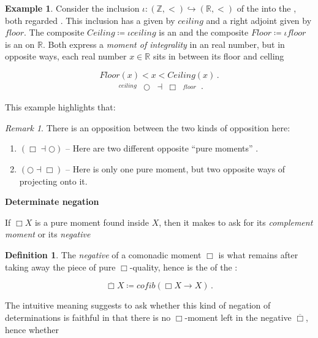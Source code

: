 \documentclass[12pt,titlepage]{article}
\newcommand{\itexarray}[1]{\begin{matrix}#1\end{matrix}}
\newcommand{\lt}{<}
\theoremstyle{plain}
\theoremstyle{definition}
\newtheorem{defn}{Definition}
\newtheorem{example}{Example}
\theoremstyle{remark}
\newtheorem{remark}{Remark}
\begin{document}
\begin{example}
\label{}\hypertarget{}{}
Consider the inclusion $\iota \colon (\mathbb{Z}, \lt) \hookrightarrow (\mathbb{R}, \lt)$ of the  into the , both regarded . This inclusion has a  given by $ceiling$ and a right adjoint given by $floor$. The composite $Ceiling \coloneqq \iota ceiling$ is an  and the composite $Floor \coloneqq \iota floor$ is an  on $\mathbb{R}$. Both express a \emph{moment of integrality} in an real number, but in opposite ways, each real number $x\in \mathbb{R}$ sits in between its floor and celling

\begin{displaymath}
Floor(x) \lt x \lt Ceiling(x)
  \,.
\end{displaymath}
\begin{displaymath}
\itexarray{
     \stackrel{ceiling}{} &\bigcirc &\dashv& \Box & \stackrel{floor}{}
  }
  \,.
\end{displaymath}
\end{example}
This example highlights that:

\begin{remark}
\label{TheTwoKindsOfOpposites}\hypertarget{TheTwoKindsOfOpposites}{}
There is an opposition between the two kinds of opposition here:

\begin{enumerate}%
\item $(\Box \dashv \bigcirc)$ -- Here are two different opposite ``pure moments'' .


\item $(\bigcirc \dashv \Box)$ -- Here is only one pure moment, but two opposite ways of projecting onto it.



\end{enumerate}
\end{remark}
\textbf{Determinate negation}

If $\Box X$ is a pure moment found inside $X$, then it makes to ask for its \emph{complement moment} or its \emph{negative}

\begin{defn}
\label{NegativeMoment}\hypertarget{NegativeMoment}{}
The \emph{negative} of a comonadic moment $\Box$ is what remains after taking away the piece of pure $\Box$-quality, hence is the  of the :

\begin{displaymath}
\overline{\Box} X \coloneqq cofib(\Box X \to X)
  \,.
\end{displaymath}
\end{defn}
The intuitive meaning suggests to ask whether this kind of negation of determinations is faithful in that there is no $\Box$-moment left in the negative $\overline{\Box}$, hence whether
\end{document}

